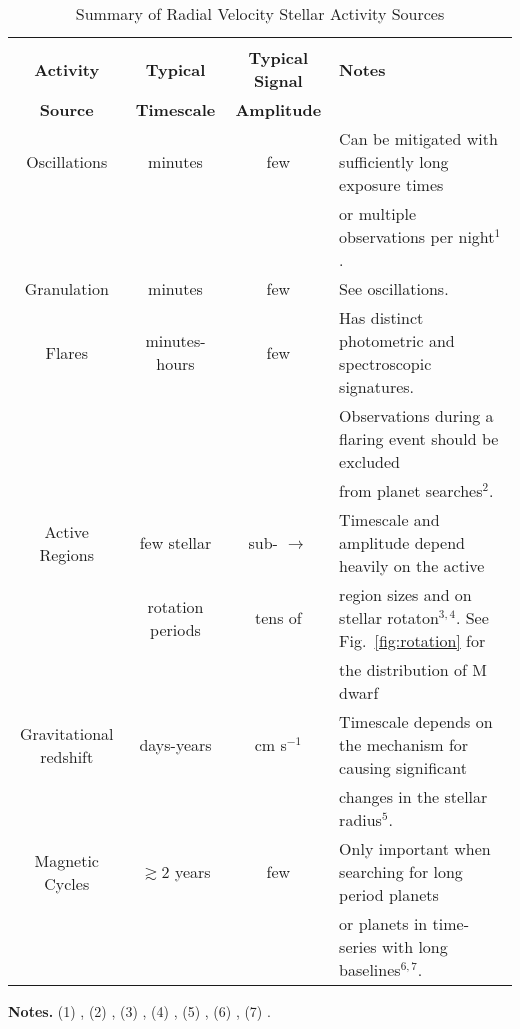 \begin{table*}
\small
\renewcommand{\arraystretch}{0.7}
\caption{Summary of Radial Velocity Stellar Activity Sources}
\label{table:activity}
\begin{tabular}{cccl}
  \hline \\ [-1ex]
  \textbf{Activity} & \textbf{Typical} & \textbf{Typical Signal} & \textbf{Notes} \\
  \textbf{Source} & \textbf{Timescale} & \textbf{Amplitude} & \\
  \hline
  Oscillations & minutes & few \mps{} & Can be mitigated with sufficiently long exposure times \\
  &&&or multiple observations per night$^1$. \\
  \hline
  Granulation & minutes & few \mps{} & See oscillations.  \\
  \hline
  Flares & minutes-hours & few \mps{} & Has distinct photometric and spectroscopic signatures. \\ 
  &&&Observations during a flaring event should be excluded \\
  &&& from planet searches$^2$. \\
  \hline
  Active Regions & few stellar & sub-\mps{} $\to$ & Timescale and amplitude depend heavily on the active \\
  & rotation periods & tens of \mps{} & region sizes and on stellar rotaton$^{3,4}$. See Fig.~\ref{fig:rotation} for \\
  &&& the distribution of M dwarf \prot{.} \\
  \hline
  Gravitational redshift & days-years & cm s$^{-1}$ & Timescale depends on the mechanism for causing significant \\
  &&& changes in the stellar radius$^5$. \\
  \hline
  Magnetic Cycles & $\gtrsim 2$ years & few \mps{} & Only important when searching for long period planets \\
  &&& or planets in time-series with long baselines$^{6,7}$.
\end{tabular}
\begin{list}{}{}
\item {\bf{Notes.}}
      (1) \cite{dumusque11a}, (2) \cite{reiners09}, (3) \cite{dumusque11b}, (4) \cite{giles17},
 	(5) \cite{cegla12}, (6) \cite{santos10}, (7) \cite{robertson14}. \\
\end{list}
\end{table*}
